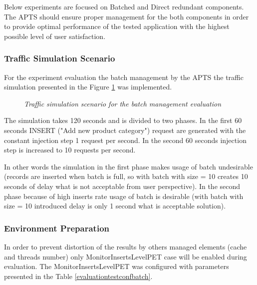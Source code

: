 \documentclass[10pt,a4paper]{article}
\begin{document}
Below experiments  are focused on Batched and Direct redundant components. The APTS should ensure proper management for the both components in order to provide optimal performance of the tested application with the highest possible level of user satisfaction.  

\subsubsection{Traffic Simulation Scenario} \label{batchsimulationscenario}

For the experiment evaluation the batch management by the APTS the traffic simulation presented in the Figure \ref{trafficbatch} was implemented.

\begin{figure}[!htb]
\caption{\textit{Traffic simulation scenario for the batch management evaluation}} \label{trafficbatch}
\end{figure}

The simulation takes 120 seconds and is divided to two phases. In the first 60 seconds INSERT ("Add new product category") request are generated with the constant injection step 1 request per second. In the second 60 seconds injection step is increased to 10 requests per second. 

In other words the simulation in the first phase makes usage of batch undesirable (records are inserted when batch is full, so with batch with size = 10 creates 10 seconds of delay what is not acceptable from user perspective). In the second phase because of high inserts rate usage of batch is desirable (with batch with size = 10 introduced delay is only 1 second what is acceptable solution).  
 
\subsubsection{Environment Preparation} 
In order to prevent distortion of the results by others managed elements (cache and threads number) only MonitorInsertsLevelPET case will be enabled during evaluation. The MonitorInsertsLevelPET was configured with parameters presented in the Table \ref{evaluationtestconfbatch}.
\end{document}
